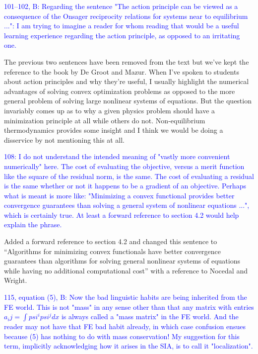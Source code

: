 \documentclass{article}
\theoremstyle{definition}
\theoremstyle{plain}
\begin{document}
\textcolor{blue}{101--102, B:  Regarding the sentence "The action principle can be viewed as a consequence of the Onsager reciprocity relations for systems near to equilibrium ...":  I am trying to imagine a reader for whom reading that would be a useful learning experience regarding the action principle, as opposed to an irritating one.}

The previous two sentences have been removed from the text but we've kept the reference to the book by De Groot and Mazur.
When I've spoken to students about action principles and why they're useful, I usually highlight the numerical advantages of solving convex optimization problems as opposed to the more general problem of solving large nonlinear systems of equations.
But the question invariably comes up as to why a given physics problem should have a minimization principle at all while others do not.
Non-equilibrium thermodynamics provides some insight and I think we would be doing a disservice by not mentioning this at all.

\textcolor{blue}{108:  I do not understand the intended meaning of "vastly more convenient numerically" here.  The cost of evaluating the objective, versus a merit function like the square of the residual norm, is the same.  The cost of evaluating a residual is the same whether or not it happens to be a gradient of an objective.  Perhaps what is meant is more like: "Minimizing a convex functional provides better convergence guarantees than solving a general system of nonlinear equations ...", which is certainly true.  At least a forward reference to section 4.2 would help explain the phrase.}

Added a forward reference to section 4.2 and changed this sentence to ``Algorithms for minimizing convex functionals have better convergence guarantees than algorithms for solving general nonlinear systems of equations while having no additional computational cost'' with a reference to Nocedal and Wright.

\textcolor{blue}{115, equation (5), B:  Now the bad linguistic habits are being inherited from the FE world.  This is not "mass" in any sense other than that any matrix with entries $a_ij = \int psi^i psi^j dx$ is always called a "mass matrix" in the FE world.  And the reader may not have that FE bad habit already, in which case confusion ensues because (5) has nothing to do with mass conservation!  My suggestion for this term, implicitly acknowledging how it arises in the SIA, is to call it "localization".}
\end{document}
